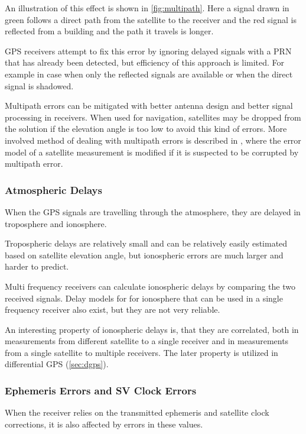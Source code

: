 An illustration of this effect is shown in \autoref{fig:multipath}.
Here a signal drawn in green follows a direct path from the satellite to the receiver
and the red signal is reflected from a building and the path it travels is longer.

GPS receivers attempt to fix this error by ignoring delayed signals with a PRN that has already been
detected, but efficiency of this approach is limited.
For example in case when only the reflected signals are available or when the direct signal is shadowed.

Multipath errors can be mitigated with better antenna design and better signal processing in receivers.
When used for navigation, satellites may be dropped from the solution if the elevation angle
is too low to avoid this kind of errors.
More involved method of dealing with multipath errors is described in \cite{viandier08},
where the error model of a satellite measurement is modified if it is suspected to be corrupted
by multipath error.


\subsubsection{Atmospheric Delays}

When the GPS signals are travelling through the atmosphere, they are delayed in troposphere and ionosphere.

Tropospheric delays are relatively small and can be relatively easily estimated based on satellite elevation
angle, but ionospheric errors are much larger and harder to predict.

Multi frequency receivers can calculate ionospheric delays by comparing the two received signals.
Delay models for for ionosphere that can be used in a single frequency receiver also exist,
but they are not very reliable.

An interesting property of ionospheric delays is, that they are correlated,
both in measurements from different satellite to a single receiver and in measurements
from a single satellite to multiple receivers.
The later property is utilized in differential GPS (\autoref{sec:dgps}).


\subsubsection{Ephemeris Errors and SV Clock Errors}

When the receiver relies on the transmitted ephemeris and satellite clock corrections,
it is also affected by errors in these values.

